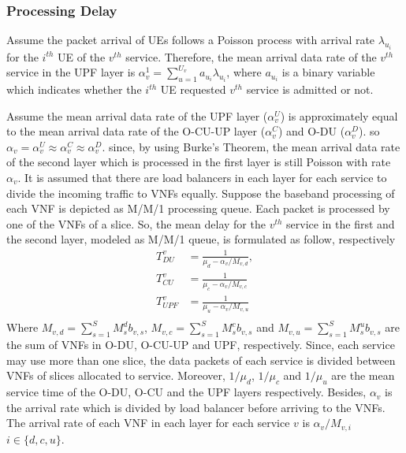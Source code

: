 \documentclass[conference]{IEEEtran}
\begin{document}
\subsubsection{Processing Delay}
Assume the packet arrival of UEs follows a Poisson process with arrival rate $\lambda_{u_i}$ for the $i^{th}$ UE of the $v^{th}$ service.
Therefore, the mean arrival data rate of the $v^{th}$ service in the UPF layer is $\alpha_{v}^1 = \sum_{u=1}^{U_v}a_{u_i}\lambda_{u_i}$, where $a_{u_i}$ is a binary variable which indicates whether the $i^{th}$ UE requested $v^{th}$ service is admitted or not.

Assume the mean arrival data rate of the UPF layer ($\alpha_{v}^U$) is approximately equal to the mean arrival data rate of the O-CU-UP layer ($\alpha_{v}^C$) and O-DU ($\alpha_{v}^D$). so $\alpha_{v} =\alpha_{v}^U \approx \alpha_{v}^C \approx \alpha_{v}^D$. since, by using Burke’s Theorem, the mean arrival data rate of the second layer which is processed in the first layer is still Poisson with rate $\alpha_{v}$.
It is assumed that there are load balancers in each layer for each service to divide the incoming traffic to VNFs equally. %
Suppose the baseband processing of each VNF is depicted as M/M/1 processing queue.
Each packet is processed by one of the VNFs of a slice. So, the mean delay for the $v^{th}$ service in the first and the second layer, modeled as M/M/1 queue, is formulated as follow, respectively
\begin{equation}
\begin{split}
T_{DU}^{v} &= \frac{1}{\mu_d - \alpha_{v}/{M_{v,d}}},\\
T_{CU}^{v} &= \frac{1}{\mu_c - \alpha_{v}/{M_{v,c}}}\\
T_{UPF}^{v} &= \frac{1}{\mu_u - \alpha_{v}/{M_{v,u}}}\\
\end{split}
\end{equation}
Where $M_{v,d} = \sum_{s=1}^{S}M_s^{d} b_{v,s}$, $M_{v,c} = \sum_{s=1}^{S}M_s^{c} b_{v,s}$ and 
$M_{v,u} = \sum_{s=1}^{S}M_s^{u} b_{v,s}$ 
are the sum of VNFs in O-DU, O-CU-UP and UPF, respectively. Since, each service may use more than one slice, the data packets of each service is divided between VNFs of slices allocated to service.
Moreover, $1/\mu_d$, $1/\mu_c$ and $1/\mu_u$ are the mean service time of the O-DU, O-CU and the UPF layers respectively.
Besides, $\alpha_{v}$ is the  arrival rate which is divided
by load balancer before arriving to the VNFs. The arrival rate of each VNF in each layer for each service 
$v$ is $\alpha_{v}/{M_{v,i}}$ $ i \in \{d,c, u\}$.
\end{document}
